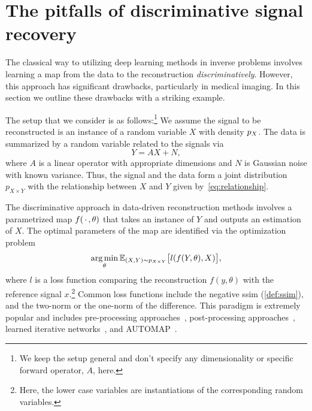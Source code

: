 \section{The pitfalls of discriminative signal recovery}%
\label{sec:discriminative pitfalls}
The classical way to utilizing deep learning methods in inverse problems involves learning a map from the data to the reconstruction \emph{discriminatively}.
However, this approach has significant drawbacks, particularly in medical imaging.
In this section we outline these drawbacks with a striking example.

The setup that we consider is as follows:\footnote{%
	We keep the setup general and don't specify any dimensionality or specific forward operator, \( A \), here.
}
We assume the signal to be reconstructed is an instance of a random variable \( X \) with density \( p_X \).
The data is summarized by a random variable related to the signals via
\begin{equation}
	Y = AX + N,
	\label{eq:relationship}
\end{equation}
where \( A \) is a linear operator with appropriate dimensions and \( N \) is Gaussian noise with known variance.
Thus, the signal and the data form a joint distribution \( p_{X\times Y} \) with the relationship between \( X \) and \( Y \) given by~\cref{eq:relationship}.

The discriminative approach in data-driven reconstruction methods involves a parametrized map \( f(\,\cdot\,, \theta) \) that takes an instance of \( Y \) and outputs an estimation of \( X \).
The optimal parameters of the map are identified via the optimization problem
\begin{equation}
	\operatorname*{arg\,min}_{\theta} \mathbb{E}_{(X, Y) \sim p_{X\times Y}} \bigl[ l(f(Y, \theta), X) \bigr],
\end{equation}
where \( l \) is a loss function comparing the reconstruction \( f(y, \theta) \) with the reference signal \( x \).\footnote{Here, the lower case variables are instantiations of the corresponding random variables.}
Common loss functions include the negative \gls{ssim} (\cref{def:ssim}), and the two-norm or the one-norm of the difference.
This paradigm is extremely popular and includes pre-processing approaches~\cite{han_k-space_2020}, post-processing approaches~\cite{zbontar_fastmri_2018}, learned iterative networks~\cite{hammernik_learning_2017}, and AUTOMAP~\cite{zhu_image_2018}.

